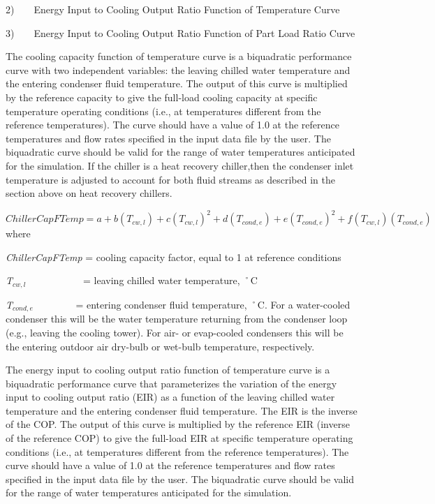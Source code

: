 2)~~~~Energy Input to Cooling Output Ratio Function of Temperature Curve

3)~~~~Energy Input to Cooling Output Ratio Function of Part Load Ratio Curve

The cooling capacity function of temperature curve is a biquadratic performance curve with two independent variables: the leaving chilled water temperature and the entering condenser fluid temperature. The output of this curve is multiplied by the reference capacity to give the full-load cooling capacity at specific temperature operating conditions (i.e., at temperatures different from the reference temperatures). The curve should have a value of 1.0 at the reference temperatures and flow rates specified in the input data file by the user. The biquadratic curve should be valid for the range of water temperatures anticipated for the simulation. If the chiller is a heat recovery chiller,then the condenser inlet temperature is adjusted to account for both fluid streams as described in the section above on heat recovery chillers.

\(ChillerCapFTemp = a + b\left( {{T_{cw,l}}} \right) + c{\left( {{T_{cw,l}}} \right)^2} + d\left( {{T_{cond,e}}} \right) + e{\left( {{T_{cond,e}}} \right)^2} + f\left( {{T_{cw,l}}} \right)\left( {{T_{cond,e}}} \right)\) where

\emph{ChillerCapFTemp} = cooling capacity factor, equal to 1 at reference conditions

\emph{T\(_{cw,l}\)}~~~~~~~~~~~ = leaving chilled water temperature, ˚C

\emph{T\(_{cond,e}\)}~~~~~~~~ = entering condenser fluid temperature, ˚C. For a water-cooled condenser this will be the water temperature returning from the condenser loop (e.g., leaving the cooling tower). For air- or evap-cooled condensers this will be the entering outdoor air dry-bulb or wet-bulb temperature, respectively.

The energy input to cooling output ratio function of temperature curve is a biquadratic performance curve that parameterizes the variation of the energy input to cooling output ratio (EIR) as a function of the leaving chilled water temperature and the entering condenser fluid temperature. The EIR is the inverse of the COP. The output of this curve is multiplied by the reference EIR (inverse of the reference COP) to give the full-load EIR at specific temperature operating conditions (i.e., at temperatures different from the reference temperatures). The curve should have a value of 1.0 at the reference temperatures and flow rates specified in the input data file by the user. The biquadratic curve should be valid for the range of water temperatures anticipated for the simulation.

